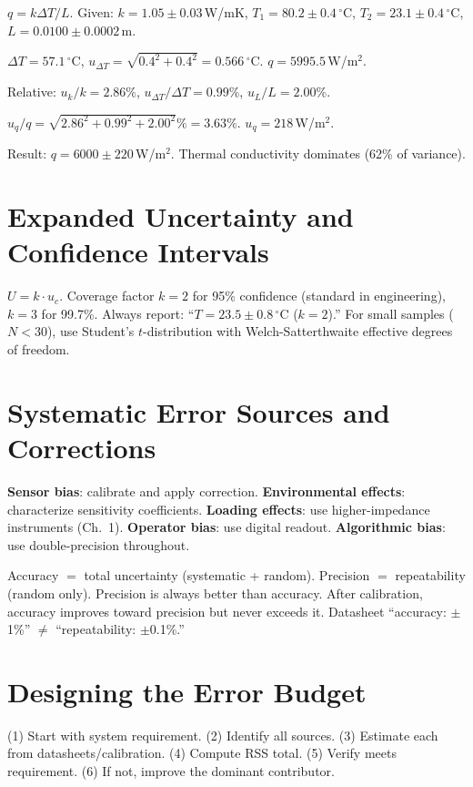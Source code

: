\documentclass[11pt,letterpaper,twoside,openany]{book}
\newcommand{\degC}{\ensuremath{{}^{\circ}\text{C}}}
\begin{document}
\begin{examplebox}
$q = k \Delta T / L$. Given: $k = 1.05 \pm 0.03$\,W/mK, $T_1 = 80.2 \pm 0.4$\,\degC{}, $T_2 = 23.1 \pm 0.4$\,\degC{}, $L = 0.0100 \pm 0.0002$\,m.

$\Delta T = 57.1$\,\degC{}, $u_{\Delta T} = \sqrt{0.4^2+0.4^2} = 0.566$\,\degC{}. $q = 5995.5$\,W/m$^2$.

Relative: $u_k/k = 2.86\%$, $u_{\Delta T}/\Delta T = 0.99\%$, $u_L/L = 2.00\%$.

$u_q/q = \sqrt{2.86^2+0.99^2+2.00^2}\% = 3.63\%$. $u_q = 218$\,W/m$^2$.

Result: $q = 6000 \pm 220$\,W/m$^2$. Thermal conductivity dominates (62\% of variance).
\end{examplebox}

\section{Expanded Uncertainty and Confidence Intervals}
$U = k \cdot u_c$. Coverage factor $k = 2$ for 95\% confidence (standard in engineering), $k = 3$ for 99.7\%. Always report: ``$T = 23.5 \pm 0.8$\,\degC{} ($k = 2$).'' For small samples ($N < 30$), use Student's $t$-distribution with Welch-Satterthwaite effective degrees of freedom.

\section{Systematic Error Sources and Corrections}
\textbf{Sensor bias}: calibrate and apply correction. \textbf{Environmental effects}: characterize sensitivity coefficients. \textbf{Loading effects}: use higher-impedance instruments (Ch.\ 1). \textbf{Operator bias}: use digital readout. \textbf{Algorithmic bias}: use double-precision throughout.

\begin{warningbox}
Accuracy $=$ total uncertainty (systematic + random). Precision $=$ repeatability (random only). Precision is always better than accuracy. After calibration, accuracy improves toward precision but never exceeds it. Datasheet ``accuracy: $\pm$1\%'' $\neq$ ``repeatability: $\pm$0.1\%.''
\end{warningbox}

\section{Designing the Error Budget}
(1) Start with system requirement. (2) Identify all sources. (3) Estimate each from datasheets/calibration. (4) Compute RSS total. (5) Verify meets requirement. (6) If not, improve the dominant contributor.
\end{document}
